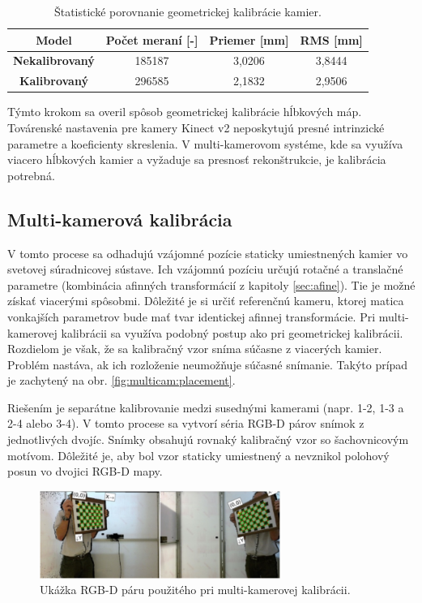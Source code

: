 \begin{table}[H]
	\caption{\label{tab:calib:single} Štatistické porovnanie geometrickej kalibrácie kamier. }
	\centering
	\begin{tabular}{cccc}
		\toprule
		\textbf{Model} & \textbf{Počet meraní [-]} & \textbf{Priemer [mm]} & \textbf{RMS [mm]} \\ 
		\midrule
		\textbf{Nekalibrovaný} & 185187 & 3,0206	& 3,8444 \\
		\textbf{Kalibrovaný} & 296585   & 2,1832   & 2,9506  \\  
		\bottomrule
	\end{tabular}
\end{table}

Týmto krokom sa overil spôsob geometrickej kalibrácie hĺbkových máp. Továrenské nastavenia pre kamery Kinect v2 neposkytujú presné intrinzické parametre a koeficienty skreslenia. V multi-kamerovom systéme, kde sa využíva viacero hĺbkových kamier a vyžaduje sa presnosť rekonštrukcie, je kalibrácia potrebná. 


\subsection{Multi-kamerová kalibrácia}

V tomto procese sa odhadujú vzájomné pozície staticky umiestnených kamier vo svetovej súradnicovej sústave. Ich vzájomnú pozíciu určujú rotačné a translačné parametre (kombinácia afinných transformácií z kapitoly \ref{sec:afine}). Tie je možné získať viacerými spôsobmi. Dôležité je si určiť referenčnú kameru, ktorej matica vonkajších parametrov bude mať tvar identickej afinnej transformácie. Pri multi-kamerovej kalibrácii sa využíva podobný postup ako pri geometrickej kalibrácii. Rozdielom je však, že sa kalibračný vzor sníma súčasne z viacerých kamier. Problém nastáva, ak ich rozloženie neumožňuje súčasné snímanie. Takýto prípad je zachytený na obr. \ref{fig:multicam:placement}.

Riešením je separátne kalibrovanie medzi susednými kamerami (napr. 1-2, 1-3 a 2-4 alebo 3-4). V tomto procese sa vytvorí séria RGB-D párov snímok z jednotlivých dvojíc. Snímky obsahujú rovnaký kalibračný vzor so šachovnicovým motívom. Dôležité je, aby bol vzor staticky umiestnený a nevznikol polohový posun vo dvojici RGB-D mapy. 


\begin{figure}[H]
	\centering
	\includegraphics[width=0.7\textwidth]{figures/calibration_multi_rgbd.jpg}
	\caption{Ukážka RGB-D páru použitého pri multi-kamerovej kalibrácii.}
	\label{fig:calib:multi:rgbd}
\end{figure}

